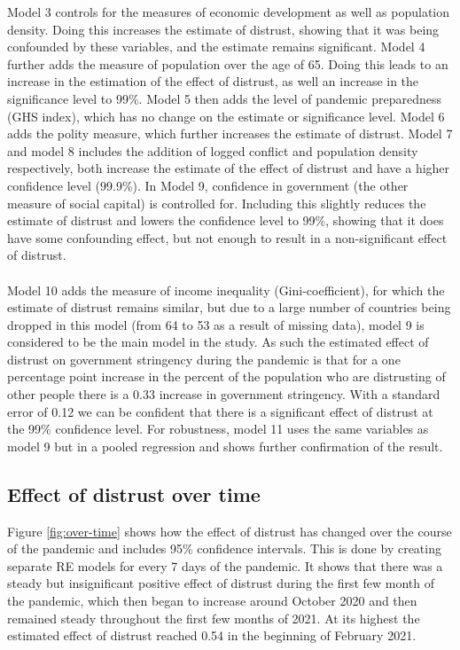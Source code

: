 \documentclass[
  12pt,
]{article}
\begin{document}
Model 3 controls for the measures of economic development as well as population density. Doing this increases the estimate of distrust, showing that it was being confounded by these variables, and the estimate remains significant. Model 4 further adds the measure of population over the age of 65. Doing this leads to an increase in the estimation of the effect of distrust, as well an increase in the significance level to 99\%. Model 5 then adds the level of pandemic preparedness (GHS index), which has no change on the estimate or significance level. Model 6 adds the polity measure, which further increases the estimate of distrust. Model 7 and model 8 includes the addition of logged conflict and population density respectively, both increase the estimate of the effect of distrust and have a higher confidence level (99.9\%). In Model 9, confidence in government (the other measure of social capital) is controlled for. Including this slightly reduces the estimate of distrust and lowers the confidence level to 99\%, showing that it does have some confounding effect, but not enough to result in a non-significant effect of distrust.\\
~\\
Model 10 adds the measure of income inequality (Gini-coefficient), for which the estimate of distrust remains similar, but due to a large number of countries being dropped in this model (from 64 to 53 as a result of missing data), model 9 is considered to be the main model in the study. As such the estimated effect of distrust on government stringency during the pandemic is that for a one percentage point increase in the percent of the population who are distrusting of other people there is a 0.33 increase in government stringency. With a standard error of 0.12 we can be confident that there is a significant effect of distrust at the 99\% confidence level. For robustness, model 11 uses the same variables as model 9 but in a pooled regression and shows further confirmation of the result.\\

\hypertarget{effect-of-distrust-over-time}{%
\subsection{Effect of distrust over time}\label{effect-of-distrust-over-time}}

Figure \ref{fig:over-time} shows how the effect of distrust has changed over the course of the pandemic and includes 95\% confidence intervals. This is done by creating separate RE models for every 7 days of the pandemic. It shows that there was a steady but insignificant positive effect of distrust during the first few month of the pandemic, which then began to increase around October 2020 and then remained steady throughout the first few months of 2021. At its highest the estimated effect of distrust reached 0.54 in the beginning of February 2021.\\
\end{document}
